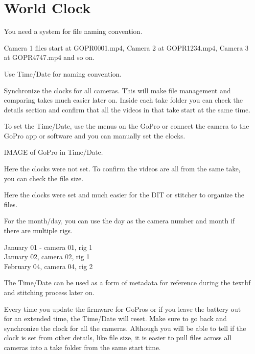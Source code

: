 \chapter{World Clock}
\pagecolor{white}
\label{chap:5}
\begin{fullwidth}


\problem

{\large You need a system for file naming convention. \par}

Camera 1 files start at GOPR0001.mp4, Camera 2 at GOPR1234.mp4, Camera 3 at GOPR4747.mp4 and so on. 


\solution

{\large Use Time/Date for naming convention. \par}

Synchronize the clocks for all cameras. This will make file management and comparing takes much easier later on. Inside each take folder you can check the details section and confirm that all the videos in that take start at the same time. 

To set the Time/Date, use the menus on the GoPro or connect the camera to the GoPro app or software and you can manually set the clocks.

IMAGE of GoPro in Time/Date.

Here the clocks were not set. To confirm the videos are all from the same take, you can check the file size. 


Here the clocks were set and much easier for the DIT or stitcher to organize the files.


For the month/day, you can use the day as the camera number and month if there are multiple rigs. 

January 01 - camera 01, rig 1
\\
January 02, camera 02, rig 1
\\
February 04, camera 04, rig 2


The Time/Date can be used as a form of metadata for reference during the textbf{} and stitching process later on. 

\tip Every time you update the firmware for GoPros or if you leave the battery out for an extended time, the Time/Date will reset. Make sure to go back and synchronize the clock for all the cameras. Although you will be able to tell if the clock is set from other details, like file size, it is easier to pull files across all cameras into a take folder from the same start time. 




\clearpage
\end{fullwidth}
